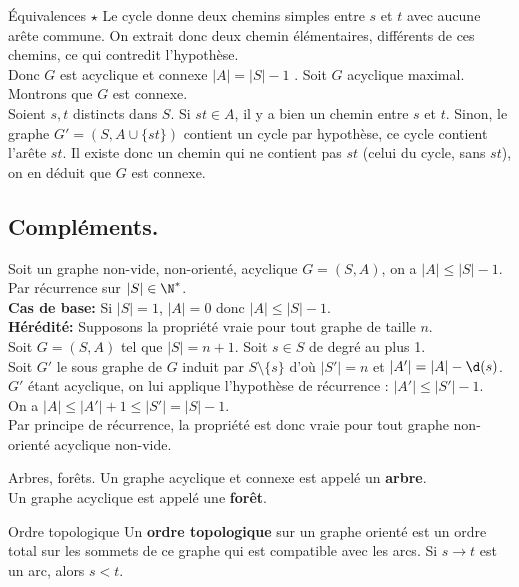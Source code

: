 \documentclass[french, 11pt]{article}
\begin{document}
\begin{prop}{Équivalences $\star$}{}
    Le cycle donne deux chemins simples entre $s$ et $t$ avec aucune arête commune. On extrait donc deux chemin élémentaires, différents de ces chemins, ce qui contredit l'hypothèse.\\
    Donc $G$ est acyclique et connexe $|A|=|S|-1$\n
    . Soit $G$ acyclique maximal. Montrons que $G$ est connexe.\\
    Soient $s,t$ distincts dans $S$. Si $st\in A$, il y a bien un chemin entre $s$ et $t$. Sinon, le graphe $G'=(S,A\cup\{st\})$ contient un cycle par hypothèse, ce cycle contient l'arête $st$. Il existe donc un chemin qui ne contient pas $st$ (celui du cycle, sans $st$), on en déduit que $G$ est connexe.
\end{prop}

\subsection{Compléments.}

\begin{prop}{}{}
    Soit un graphe non-vide, non-orienté, acyclique $G=(S,A)$, on a $|A|\leq|S|-1$.
    \tcblower
    Par récurrence sur $|S|\in\N^*$.\\
    \textbf{Cas de base:} Si $|S|=1$, $|A|=0$ donc $|A|\leq|S|-1$.\\
    \textbf{Hérédité:} Supposons la propriété vraie pour tout graphe de taille $n$.\\
    Soit $G=(S,A)$ tel que $|S|=n+1$. Soit $s\in S$ de degré au plus 1.\\
    Soit $G'$ le sous graphe de $G$ induit par $S\setminus\{s\}$ d'où $|S'| = n$ et $|A'|=|A|-\d(s)$.\\
    $G'$ étant acyclique, on lui applique l'hypothèse de récurrence : $|A'|\leq|S'|-1$.\\
    On a $|A|\leq|A'|+1\leq|S'|=|S|-1$.\\
    Par principe de récurrence, la propriété est donc vraie pour tout graphe non-orienté acyclique non-vide.
\end{prop}

\begin{defi}{Arbres, forêts.}{}
    Un graphe acyclique et connexe est appelé un \textbf{arbre}.\\
    Un graphe acyclique est appelé une \textbf{forêt}. 
\end{defi}

\begin{defi}{Ordre topologique}{}
    Un \textbf{ordre topologique} sur un graphe orienté est un ordre total sur les sommets de ce graphe qui est compatible avec les arcs. Si $s\to t$ est un arc, alors $s<t$.
\end{defi}
\end{document}

